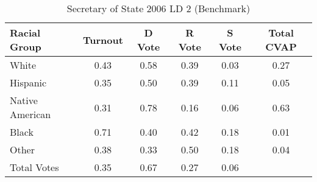 \begin{table}[htb]
\begin{center}
\caption{Secretary of State 2006 LD 2 (Benchmark)}
\label{sos06_cvap_ld_2_benchmark}
\begin{tabular}{lccccc}
  \hline
Racial Group & Turnout & D Vote & R Vote & S Vote & Total CVAP \\ 
  \hline
White & 0.43 & 0.58 & 0.39 & 0.03 & 0.27 \\ 
  Hispanic & 0.35 & 0.50 & 0.39 & 0.11 & 0.05 \\ 
  Native American & 0.31 & 0.78 & 0.16 & 0.06 & 0.63 \\ 
  Black & 0.71 & 0.40 & 0.42 & 0.18 & 0.01 \\ 
  Other & 0.38 & 0.33 & 0.50 & 0.18 & 0.04 \\ 
  Total Votes & 0.35 & 0.67 & 0.27 & 0.06 &  \\ 
   \hline
\end{tabular}
\end{center}
\end{table}

